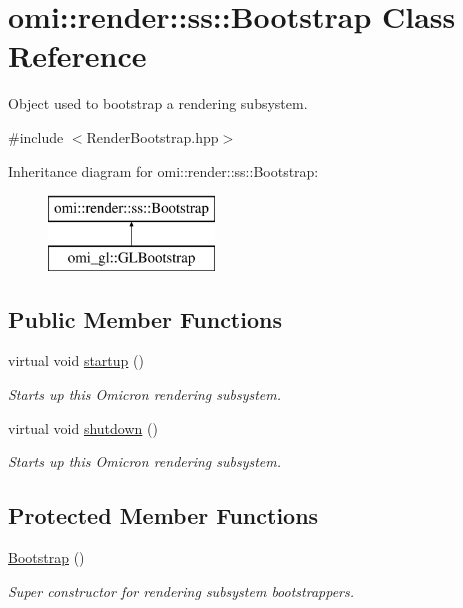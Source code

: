 \hypertarget{classomi_1_1render_1_1ss_1_1_bootstrap}{}\section{omi\+:\+:render\+:\+:ss\+:\+:Bootstrap Class Reference}
\label{classomi_1_1render_1_1ss_1_1_bootstrap}


Object used to bootstrap a rendering subsystem.  




{\ttfamily \#include $<$Render\+Bootstrap.\+hpp$>$}

Inheritance diagram for omi\+:\+:render\+:\+:ss\+:\+:Bootstrap\+:\begin{figure}[H]
\begin{center}
\leavevmode
\includegraphics[height=2.000000cm]{classomi_1_1render_1_1ss_1_1_bootstrap}
\end{center}
\end{figure}
\subsection*{Public Member Functions}
\begin{DoxyCompactItemize}
\item 
virtual void \hyperlink{classomi_1_1render_1_1ss_1_1_bootstrap_a3b7e12774f56ce17baee150c5c85e1cb}{startup} ()
\begin{DoxyCompactList}\small\item\em Starts up this Omicron rendering subsystem. \end{DoxyCompactList}\item 
virtual void \hyperlink{classomi_1_1render_1_1ss_1_1_bootstrap_af4f13ba4968f7dac6141a7c558188aaf}{shutdown} ()
\begin{DoxyCompactList}\small\item\em Starts up this Omicron rendering subsystem. \end{DoxyCompactList}\end{DoxyCompactItemize}
\subsection*{Protected Member Functions}
\begin{DoxyCompactItemize}
\item 
\hyperlink{classomi_1_1render_1_1ss_1_1_bootstrap_a1ebc5b7615d6a3258a2fbeca135e8fae}{Bootstrap} ()\hypertarget{classomi_1_1render_1_1ss_1_1_bootstrap_a1ebc5b7615d6a3258a2fbeca135e8fae}{}\label{classomi_1_1render_1_1ss_1_1_bootstrap_a1ebc5b7615d6a3258a2fbeca135e8fae}

\begin{DoxyCompactList}\small\item\em Super constructor for rendering subsystem bootstrappers. \end{DoxyCompactList}\end{DoxyCompactItemize}


